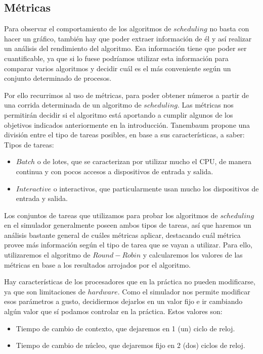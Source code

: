 \subsection{Métricas}

Para observar el comportamiento de los algoritmos de $scheduling$ no basta con hacer un gráfico, también hay que poder extraer información de él y así realizar un análisis del rendimiento del algoritmo. Esa informaci\'on tiene que poder ser cuantificable, ya que si lo fuese podr\'iamos utilizar esta informaci\'on para comparar varios algoritmos y decidir cu\'al es el m\'as conveniente seg\'un un conjunto determinado de procesos. 

Por ello recurrimos al uso de m\'etricas, para poder obtener n\'umeros a partir de una corrida determinada de un algoritmo de $scheduling$. Las m\'etricas nos permitir\'an decidir si el algoritmo est\'a aportando a cumplir algunos de los objetivos indicados anteriormente en la introducci\'on. Tanembaum\cite{Tanen} propone una divisi\'on entre el tipo de tareas posibles, en base a sus caracter\'isticas, a saber:\\

Tipos de tareas:
\begin{itemize}
	\item $Batch$ o de lotes, que se caracterizan por utilizar mucho el CPU, de manera continua y con pocos accesos a dispositivos de entrada y salida.
	\item $Interactive$ o interactivos, que particularmente usan mucho los dispositivos de entrada y salida.  
\end{itemize}

Los conjuntos de tareas que utilizamos para probar los algoritmos de $scheduling$ en el simulador generalmente poseen ambos tipos de tareas, as\'i que haremos un an\'alisis bastante general de cu\'ales m\'etricas aplicar, destacando cuál métrica provee más información según el tipo de tarea que se vayan a utilizar. Para ello, utilizaremos el algoritmo de $Round-Robin$ y calcularemos los valores de las métricas en base a los resultados arrojados por el algoritmo. 

Hay características de los procesadores que en la práctica no pueden modificarse, ya que son limitaciones de $hardware$. Como el simulador nos permite modificar esos parámetros a gusto, decidiermos dejarlos en un valor fijo e ir cambiando algún valor que sí podamos controlar en la práctica. Estos valores son:

\begin{itemize}
	\item Tiempo de cambio de contexto, que dejaremos en 1 (un) ciclo de reloj.
	\item Tiempo de cambio de núcleo, que dejaremos fijo en 2 (dos) ciclos de reloj.
\end{itemize}

